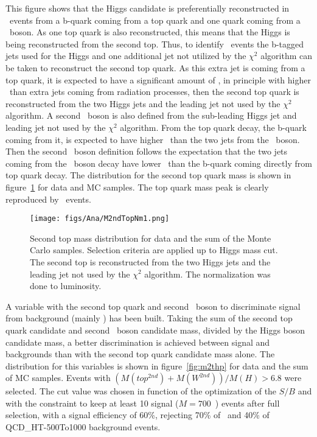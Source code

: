 This figure shows that the Higgs candidate is preferentially reconstructed in \ttbar~events from a b-quark coming from a top quark and one quark coming from a \W~boson. As one top quark is also reconstructed, this means that the Higgs is being reconstructed from the second top. Thus, to identify \ttbar~events the b-tagged jets used for the Higgs and one additional jet not utilized by the $\chi^{2}$ algorithm can be taken to reconstruct the second top quark. As this extra jet is coming from a top quark, it is expected to have a significant amount of \pt, in principle with higher \pt~than extra jets coming from radiation processes, then the second top quark is reconstructed from the two Higgs jets and the leading jet not used by the $\chi^{2}$ algorithm. A second \W~boson is also defined from the sub-leading Higgs jet and leading jet not used by the $\chi^{2}$ algorithm. From the top quark decay, the b-quark coming from it, is expected to have higher \pt~than the two jets from the \W~boson. Then the second \W~boson definition follows the expectation that the two jets coming from the \W~boson decay have lower \pt~than the b-quark coming directly from top quark decay. The distribution for the second top quark mass is shown in figure~\ref{fig:2ndTM} for data and MC samples. The top quark mass peak is clearly reproduced by \ttbar~events.

\begin{figure}[!Hhtbp]
  \begin{center}
    \texttt{[image: figs/Ana/M2ndTopNm1.png]}
    \caption{Second top mass distribution for data and the sum of the Monte Carlo samples. Selection criteria are applied up to Higgs mass cut. The second top is reconstructed from the two Higgs jets and the leading jet not used by the $\chi^{2}$ algorithm. The normalization was done to luminosity.}
    \label{fig:2ndTM}
  \end{center}
\end{figure}

A variable with the second top quark and second \W~boson to discriminate signal from background (mainly \ttbar) has been built. Taking the sum of the second top quark candidate and second \W~boson candidate mass, divided by the Higgs boson candidate mass, a better discrimination is achieved between signal and backgrounds than with the second top quark candidate mass alone. The distribution for this variables is shown in figure~\ref{fig:m2thp} for data and the sum of MC samples. Events with $(M(top^{2nd})+M(W^{2nd}))/M(H)>6.8$ were selected. The cut value was chosen in function of the optimization of the $S/B$ and with the constraint to keep at least 10 signal (${M=700}$~\GeVcc) events after full selection, with a signal efficiency of 60\%, rejecting 70\% of \ttbar~and 40\% of QCD\_HT-500To1000 background events.

